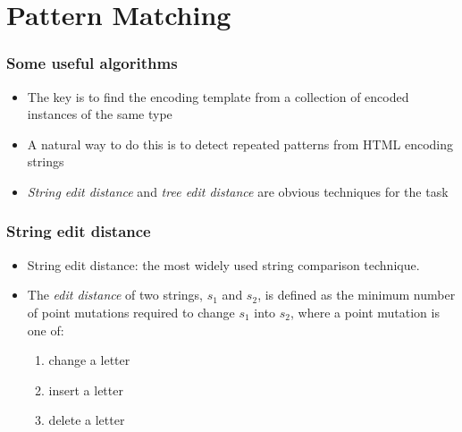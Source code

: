 \documentclass[svgnames]{beamer}
\begin{document}

\section{Pattern Matching}

\begin{frame} \frametitle{Some useful algorithms}
  
  \begin{itemize}
  \item The key is to find the encoding template from a collection of
    encoded instances of the same type
  \item A natural way to do this is to detect repeated patterns from HTML
    encoding strings
  \item \emph{String edit distance} and \emph{tree edit distance} are obvious
    techniques for the task
  \end{itemize}

\end{frame}


\begin{frame} \frametitle{String edit distance}
  
  \begin{itemize}
  \item String edit distance: the most widely used string comparison technique.
  \item The \emph{edit distance} of two strings, $s_1$ and $s_2$, is defined as
    the minimum number of point mutations required to change $s_1$ into $s_2$,
    where a point mutation is one of:
    \begin{enumerate}
    \item change a letter
    \item insert a letter
    \item delete a letter
    \end{enumerate}
  \end{itemize}

\end{frame}

\end{document}
